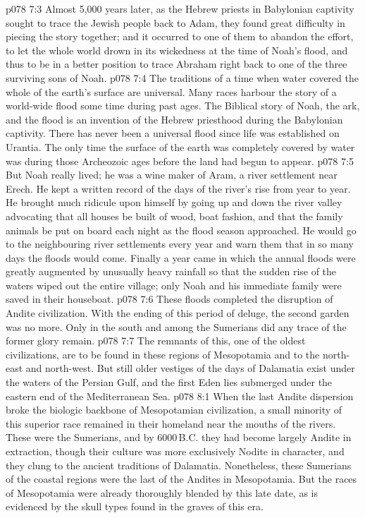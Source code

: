 \vs p078 7:3 \pc Almost 5,000 years later, as the Hebrew priests in Babylonian captivity sought to trace the Jewish people back to Adam, they found great difficulty in piecing the story together; and it occurred to one of them to abandon the effort, to let the whole world drown in its wickedness at the time of Noah’s flood, and thus to be in a better position to trace Abraham right back to one of the three surviving sons of Noah.
\vs p078 7:4 The traditions of a time when water covered the whole of the earth’s surface are universal. Many races harbour the story of a world\hyp{}wide flood some time during past ages. The Biblical story of Noah, the ark, and the flood is an invention of the Hebrew priesthood during the Babylonian captivity. There has never been a universal flood since life was established on Urantia. The only time the surface of the earth was completely covered by water was during those Archeozoic ages before the land had begun to appear.
\vs p078 7:5 But Noah really lived; he was a wine maker of Aram, a river settlement near Erech. He kept a written record of the days of the river’s rise from year to year. He brought much ridicule upon himself by going up and down the river valley advocating that all houses be built of wood, boat fashion, and that the family animals be put on board each night as the flood season approached. He would go to the neighbouring river settlements every year and warn them that in so many days the floods would come. Finally a year came in which the annual floods were greatly augmented by unusually heavy rainfall so that the sudden rise of the waters wiped out the entire village; only Noah and his immediate family were saved in their houseboat.
\vs p078 7:6 \pc These floods completed the disruption of Andite civilization. With the ending of this period of deluge, the second garden was no more. Only in the south and among the Sumerians did any trace of the former glory remain.
\vs p078 7:7 The remnants of this, one of the oldest civilizations, are to be found in these regions of Mesopotamia and to the north\hyp{}east and north\hyp{}west. But still older vestiges of the days of Dalamatia exist under the waters of the Persian Gulf, and the first Eden lies submerged under the eastern end of the Mediterranean Sea.
\vs p078 8:1 When the last Andite dispersion broke the biologic backbone of Mesopotamian civilization, a small minority of this superior race remained in their homeland near the mouths of the rivers. These were the Sumerians, and by 6000\,B.C. they had become largely Andite in extraction, though their culture was more exclusively Nodite in character, and they clung to the ancient traditions of Dalamatia. Nonetheless, these Sumerians of the coastal regions were the last of the Andites in Mesopotamia. But the races of Mesopotamia were already thoroughly blended by this late date, as is evidenced by the skull types found in the graves of this era.
